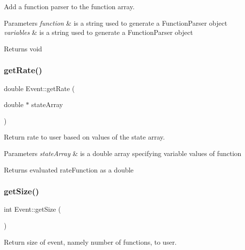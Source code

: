 Add a function parser to the function array. 


\begin{DoxyParams}{Parameters}
{\em function} & is a string used to generate a Function\+Parser object \\
\hline
{\em variables} & is a string used to generate a Function\+Parser object \\
\hline
\end{DoxyParams}
\begin{DoxyReturn}{Returns}
void 
\end{DoxyReturn}
\mbox{\label{class_event_a2288e3b3fa19e076e04bba11b88d189a}} 
\subsubsection{\texorpdfstring{get\+Rate()}{getRate()}}
{\footnotesize\ttfamily double Event\+::get\+Rate (\begin{DoxyParamCaption}\item[{double $\ast$}]{state\+Array }\end{DoxyParamCaption})}



Return rate to user based on values of the state array. 


\begin{DoxyParams}{Parameters}
{\em state\+Array} & is a double array specifying variable values of function \\
\hline
\end{DoxyParams}
\begin{DoxyReturn}{Returns}
evaluated rate\+Function as a double 
\end{DoxyReturn}
\mbox{\label{class_event_a1a0f2e2dc0b203f7be0f1d5b8810c6a2}} 
\subsubsection{\texorpdfstring{get\+Size()}{getSize()}}
{\footnotesize\ttfamily int Event\+::get\+Size (\begin{DoxyParamCaption}{ }\end{DoxyParamCaption})}



Return size of event, namely number of functions, to user. 

